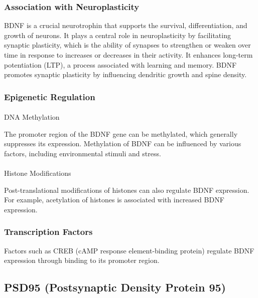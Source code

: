 \documentclass[
]{agujournal2019}
\makeatletter
\let\oldparagraph\paragraph
\renewcommand{\paragraph}{
    \@ifstar
      \xxxParagraphStar
      \xxxParagraphNoStar
  }
\newcommand{\xxxParagraphStar}[1]{\oldparagraph*{#1}\mbox{}}
\newcommand{\xxxParagraphNoStar}[1]{\oldparagraph{#1}\mbox{}}
\makeatother
\begin{document}
\subsubsection{Association with
Neuroplasticity}\label{association-with-neuroplasticity}

BDNF is a crucial neurotrophin that supports the survival,
differentiation, and growth of neurons. It plays a central role in
neuroplasticity by facilitating synaptic plasticity, which is the
ability of synapses to strengthen or weaken over time in response to
increases or decreases in their activity. It enhances long-term
potentiation (LTP), a process associated with learning and memory. BDNF
promotes synaptic plasticity by influencing dendritic growth and spine
density.

\subsubsection{Epigenetic Regulation}\label{epigenetic-regulation}

\paragraph{DNA Methylation}\label{dna-methylation}

The promoter region of the BDNF gene can be methylated, which generally
suppresses its expression. Methylation of BDNF can be influenced by
various factors, including environmental stimuli and stress.

\paragraph{Histone Modifications}\label{histone-modifications}

Post-translational modifications of histones can also regulate BDNF
expression. For example, acetylation of histones is associated with
increased BDNF expression.

\subsubsection{Transcription Factors}\label{transcription-factors}

Factors such as CREB (cAMP response element-binding protein) regulate
BDNF expression through binding to its promoter region.

\subsection{PSD95 (Postsynaptic Density Protein
95)}\label{psd95-postsynaptic-density-protein-95}
\end{document}
